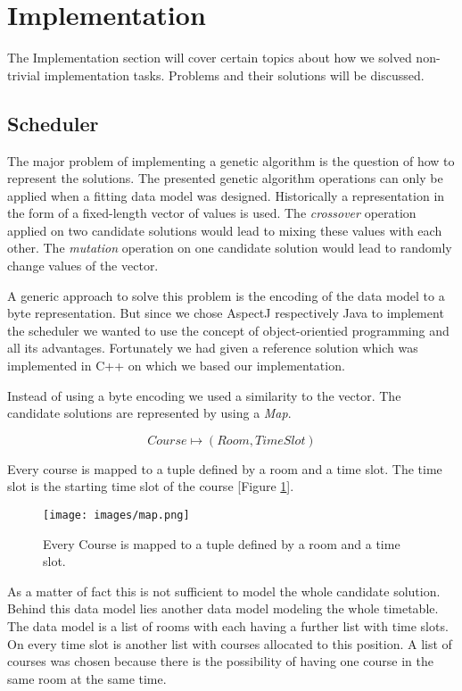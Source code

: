 \section{Implementation}

The Implementation section will cover certain topics about how we solved non-trivial implementation tasks. Problems and their solutions will be discussed.

\subsection{Scheduler}

The major problem of implementing a genetic algorithm is the question of how to represent the solutions. The presented genetic algorithm operations can only be applied when a fitting data model was designed. Historically a representation in the form of a fixed-length vector of values is used. The \emph{crossover} operation applied on two candidate solutions would lead to mixing these values with each other. The \emph{mutation} operation on one candidate solution would lead to randomly change values of the vector.

A generic approach to solve this problem is the encoding of the data model to a byte representation. But since we chose AspectJ respectively Java to implement the scheduler we wanted to use the concept of object-orientied programming and all its advantages. Fortunately we had given a reference solution which was implemented in C++ on which we based our implementation.

Instead of using a byte encoding we used a similarity to the vector. The candidate solutions are represented by using a \emph{Map}.

\[Course \mapsto (Room,Time Slot)\]

Every course is mapped to a tuple defined by a room and a time slot. The time slot is the starting time slot of the course [Figure \ref{fig:map}].

\begin{figure}[H]
\texttt{[image: images/map.png]}%
\caption{Every Course is mapped to a tuple defined by a room and a time slot.}%
\label{fig:map}%
\end{figure}

 As a matter of fact this is not sufficient to model the whole candidate solution. Behind this data model lies another data model modeling the whole timetable. The data model is a list of rooms with each having a further list with time slots. On every time slot is another list with courses allocated to this position. A list of courses was chosen because there is the possibility of having one course in the same room at the same time.

